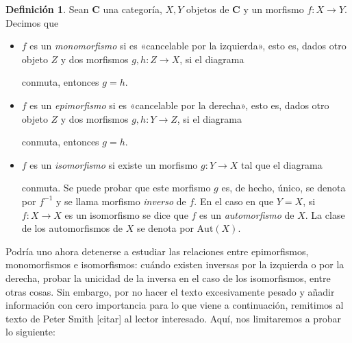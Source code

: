 \documentclass[12pt,a4paper]{book}
\theoremstyle{definition} \newtheorem{defn}[thm]{Definición}
\theoremstyle{definition} \newtheorem{ejemplo}[thm]{Ejemplo}
\theoremstyle{definition} \newtheorem{ejercicio}[thm]{Ejercicio}
\theoremstyle{remark} \newtheorem*{obs}{Observación}
\def\id{\mathbf{1}}
\def\cat{\mathbf{C}}
\def\aut{\mathrm{Aut}}
\begin{document}
\begin{defn}
  Sean $\cat$ una categoría, $X,Y$ objetos de $\cat$ y un morfismo $f:X\rightarrow Y$. Decimos que 
  \begin{itemize}
    \item $f$ es un \emph{monomorfismo} si es «cancelable por la izquierda», esto es, dados otro objeto $Z$ y dos morfismos $g,h:Z\rightarrow X$, si el diagrama
      \begin{center}
      \end{center}
      conmuta, entonces $g=h$.
    \item $f$ es un \emph{epimorfismo} si es «cancelable por la derecha», esto es, dados otro objeto $Z$ y dos morfismos $g,h:Y \rightarrow Z$, si el diagrama
      \begin{center}
      \end{center}
      conmuta, entonces $g=h$.
    \item $f$ es un \emph{isomorfismo} si existe un morfismo $g:Y\rightarrow X$ tal que el diagrama
  \begin{center}
  \end{center}
  conmuta. Se puede probar que este morfismo $g$ es, de hecho, único, se denota por $f^{-1}$ y se llama morfismo \emph{inverso} de $f$. En el caso en que $Y=X$, si $f:X\rightarrow X$ es un isomorfismo se dice que $f$ es un \emph{automorfismo} de $X$. La clase de los automorfismos de $X$ se denota por $\aut(X)$.
  \end{itemize}
\end{defn}

Podría uno ahora detenerse a estudiar las relaciones entre epimorfismos, monomorfismos e isomorfismos: cuándo existen inversas por la izquierda o por la derecha, probar la unicidad de la inversa en el caso de los isomorfismos, entre otras cosas. Sin embargo, por no hacer el texto excesivamente pesado y añadir información con cero importancia para lo que viene a continuación, remitimos al texto de Peter Smith [citar] al lector interesado. Aquí, nos limitaremos a probar lo siguiente:
\end{document}
